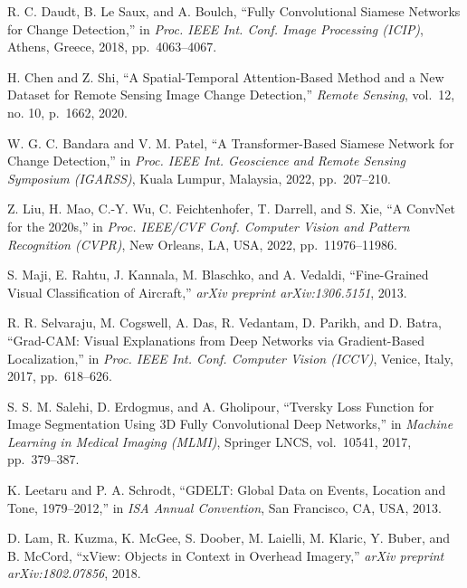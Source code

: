 \documentclass[11pt,a4paper]{article}
\begin{document}
\begin{list}{}{\setlength{\leftmargin}{1.5em}\setlength{\itemindent}{-1.5em}\setlength{\itemsep}{6pt}}
\item [1] R. C. Daudt, B. Le Saux, and A. Boulch, ``Fully Convolutional Siamese Networks for Change Detection,'' in \emph{Proc. IEEE Int. Conf. Image Processing (ICIP)}, Athens, Greece, 2018, pp.~4063--4067.

\item [2] H. Chen and Z. Shi, ``A Spatial-Temporal Attention-Based Method and a New Dataset for Remote Sensing Image Change Detection,'' \emph{Remote Sensing}, vol.~12, no. 10, p.~1662, 2020.

\item [3] W. G. C. Bandara and V. M. Patel, ``A Transformer-Based Siamese Network for Change Detection,'' in \emph{Proc. IEEE Int. Geoscience and Remote Sensing Symposium (IGARSS)}, Kuala Lumpur, Malaysia, 2022, pp.~207--210.

\item [4] Z. Liu, H. Mao, C.-Y. Wu, C. Feichtenhofer, T. Darrell, and S. Xie, ``A ConvNet for the 2020s,'' in \emph{Proc. IEEE/CVF Conf. Computer Vision and Pattern Recognition (CVPR)}, New Orleans, LA, USA, 2022, pp.~11976--11986.

\item [5] S. Maji, E. Rahtu, J. Kannala, M. Blaschko, and A. Vedaldi, ``Fine-Grained Visual Classification of Aircraft,'' \emph{arXiv preprint arXiv:1306.5151}, 2013.

\item [6] R. R. Selvaraju, M. Cogswell, A. Das, R. Vedantam, D. Parikh, and D. Batra, ``Grad-CAM: Visual Explanations from Deep Networks via Gradient-Based Localization,'' in \emph{Proc. IEEE Int. Conf. Computer Vision (ICCV)}, Venice, Italy, 2017, pp.~618--626.

\item [7] S. S. M. Salehi, D. Erdogmus, and A. Gholipour, ``Tversky Loss Function for Image Segmentation Using 3D Fully Convolutional Deep Networks,'' in \emph{Machine Learning in Medical Imaging (MLMI)}, Springer LNCS, vol.~10541, 2017, pp.~379--387.

\item [8] K. Leetaru and P. A. Schrodt, ``GDELT: Global Data on Events, Location and Tone, 1979--2012,'' in \emph{ISA Annual Convention}, San Francisco, CA, USA, 2013.

\item [9] D. Lam, R. Kuzma, K. McGee, S. Doober, M. Laielli, M. Klaric, Y. Buber, and B. McCord, ``xView: Objects in Context in Overhead Imagery,'' \emph{arXiv preprint arXiv:1802.07856}, 2018.


\end{list}
\end{document}
